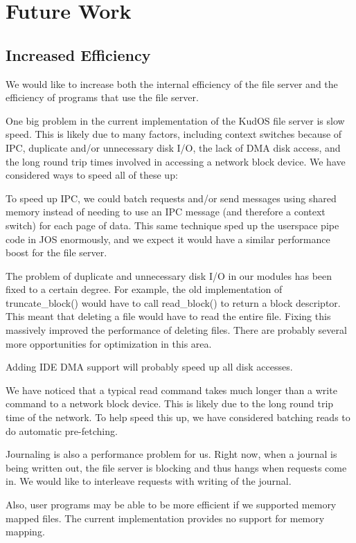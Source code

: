\section{Future Work}
\label{sec:future}

\subsection{Increased Efficiency}

We would like to increase both the internal efficiency of the file server and
the efficiency of programs that use the file server.

One big problem in the current implementation of the KudOS file server is slow
speed. This is likely due to many factors, including context switches because of
IPC, duplicate and/or unnecessary disk I/O, the lack of DMA disk access, and the
long round trip times involved in accessing a network block device. We have
considered ways to speed all of these up:

To speed up IPC, we could batch requests and/or send messages using shared
memory instead of needing to use an IPC message (and therefore a context switch)
for each page of data. This same technique sped up the userspace pipe code in
JOS enormously, and we expect it would have a similar performance boost for the
file server.

The problem of duplicate and unnecessary disk I/O in our modules has been fixed
to a certain degree. For example, the old implementation of truncate\_block()
would have to call read\_block() to return a block descriptor. This meant that
deleting a file would have to read the entire file. Fixing this massively
improved the performance of deleting files. There are probably several more
opportunities for optimization in this area.

Adding IDE DMA support will probably speed up all disk accesses.

We have noticed that a typical read command takes much longer than a write
command to a network block device. This is likely due to the long round trip
time of the network. To help speed this up, we have considered batching reads to
do automatic pre-fetching.

Journaling is also a performance problem for us. Right now, when a journal is
being written out, the file server is blocking and thus hangs when requests come
in. We would like to interleave requests with writing of the journal.

Also, user programs may be able to be more efficient if we supported memory
mapped files. The current implementation provides no support for memory mapping.

